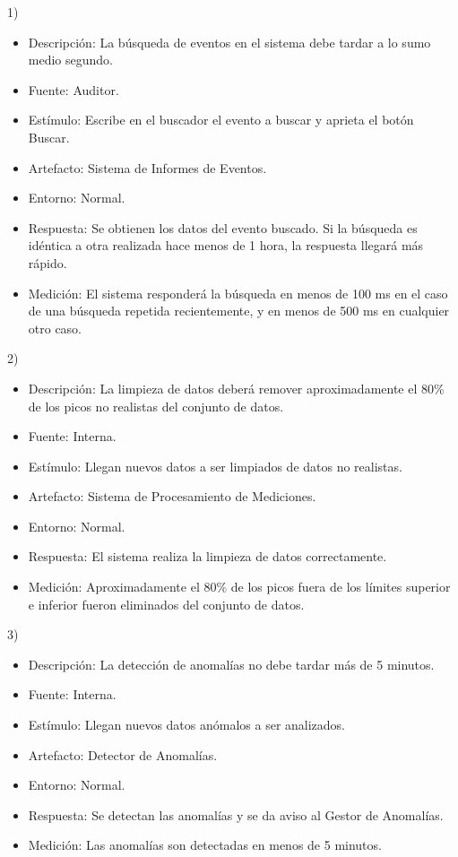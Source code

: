 \documentclass{article}
\theoremstyle{definition}
\theoremstyle{remark}
\begin{document}
1)
\begin{itemize}
  \item Descripción: La búsqueda de eventos en el sistema debe tardar a lo sumo medio segundo.
  \item Fuente: Auditor.
  \item Estímulo: Escribe en el buscador el evento a buscar y aprieta el botón Buscar.
  \item Artefacto: Sistema de Informes de Eventos.
  \item Entorno: Normal.
  \item Respuesta: Se obtienen los datos del evento buscado. Si la búsqueda es idéntica a otra realizada hace menos de 1 hora, la respuesta llegará más rápido.
  \item Medición: El sistema responderá la búsqueda en menos de 100 ms en el caso de una búsqueda repetida recientemente, y en menos de 500 ms en cualquier otro caso.
\end{itemize}

2)
\begin{itemize}
  \item Descripción: La limpieza de datos deberá remover aproximadamente el 80\% de los picos no realistas del conjunto de datos.
  \item Fuente: Interna. %
  \item Estímulo: Llegan nuevos datos a ser limpiados de datos no realistas. %
  \item Artefacto: Sistema de Procesamiento de Mediciones. %
  \item Entorno: Normal.
  \item Respuesta: El sistema realiza la limpieza de datos correctamente.
  \item Medición: Aproximadamente el 80\% de los picos fuera de los límites superior e inferior fueron eliminados del conjunto de datos.
\end{itemize}

3)
\begin{itemize}
  \item Descripción: La detección de anomalías no debe tardar más de 5 minutos.
  \item Fuente: Interna.
  \item Estímulo: Llegan nuevos datos anómalos a ser analizados.
  \item Artefacto: Detector de Anomalías.
  \item Entorno: Normal.
  \item Respuesta: Se detectan las anomalías y se da aviso al Gestor de Anomalías.
  \item Medición: Las anomalías son detectadas en menos de 5 minutos.
\end{itemize}
\end{document}
